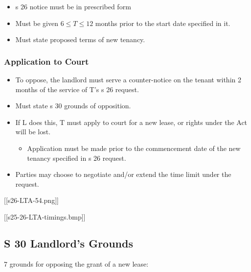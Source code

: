 \documentclass[
]{article}
\providecommand{\tightlist}{%
  \setlength{\itemsep}{0pt}\setlength{\parskip}{0pt}}
\begin{document}
\begin{itemize}
\tightlist
\item
  s 26 notice must be in prescribed form
\item
  Must be given \(6 \leq T \leq 12\) months prior to the start date
  specified in it.
\item
  Must state proposed terms of new tenancy.
\end{itemize}

\hypertarget{application-to-court-1}{%
\subsubsection{Application to Court}\label{application-to-court-1}}

\begin{itemize}
\tightlist
\item
  To oppose, the landlord must serve a counter-notice on the tenant
  within 2 months of the service of T's s 26 request.
\item
  Must state s 30 grounds of opposition.
\item
  If L does this, T must apply to court for a new lease, or rights under
  the Act will be lost.

  \begin{itemize}
  \tightlist
  \item
    Application must be made prior to the commencement date of the new
    tenancy specified in s 26 request.
  \end{itemize}
\item
  Parties may choose to negotiate and/or extend the time limit under the
  request.
\end{itemize}

{[}{[}s26-LTA-54.png{]}{]}

{[}{[}s25-26-LTA-timings.bmp{]}{]}

\hypertarget{s-30-landlords-grounds}{%
\subsection{S 30 Landlord's Grounds}\label{s-30-landlords-grounds}}

7 grounds for opposing the grant of a new lease:
\end{document}
